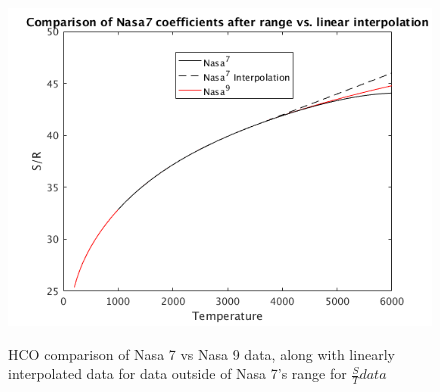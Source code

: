 \documentclass{article}
\begin{document}
\begin{figure}
  \centering
  \includegraphics[width=\textwidth]{ST.png}
  \label{fig:sT}
  \caption{HCO comparison of Nasa 7 vs Nasa 9 data, along with linearly interpolated data for data outside of Nasa 7's range for $\frac{S}{T} data$}
\end{figure}
\end{document}
